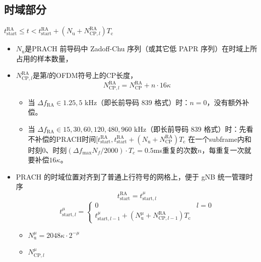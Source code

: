 \documentclass{article}
\begin{document}
\subsection{时域部分}
$t^{\text{RA}}_{\text{start}} \leq t < t^{\text{RA}}_{\text{start}} + (N_{\text{u}} + N_{\text{CP}, l}^{\text{RA}})T_\text{c}$
\begin{itemize}
\item $N_{\text{u}}$是PRACH 前导码中 Zadoff-Chu 序列（或其它低 PAPR 序列）在时域上所占用的样本数量，{\color{darkred}{具体见TS38211 Table 6.3.3.1-1 \& Table 6.3.3.1-2}}\cite{38211}\\
\item $N_{\text{CP}, l}^{\text{RA}}$是第$l$的OFDM符号上的CP长度，{\color{darkred}{具体见TS38211 Table 6.3.3.1-1 \& Table 6.3.3.1-2}}\cite{38211}\\
\[
N_{\text{CP}, l}^{\text{RA}} = N_{\text{CP}}^{\text{RA}} + n \cdot 16 \kappa
\]
	\begin{itemize}
	\item 当 $\Delta f_{\text{RA}}\in{1.25, 5}$ kHz（即长前导码 839 格式）时：$n=0$，没有额外补偿。
	\item 当 $\Delta f_{\text{RA}}\in{15,30,60,120,480,960}$ kHz（即长前导码 839 格式）时：先看不补偿的PRACH时间$[t^{\text{RA}}_{\text{start}}, t^{\text{RA}}_{\text{start}} + (N_{\text{u}} + N_{\text{CP}}^{\text{RA}})T_\text{c}$ 在一个subframe内和时刻0、时刻$(\Delta f_{\max}N_f/2000)\cdot T_c=0.5$ms重复的次数$n$，每重复一次就要补偿$16 \kappa$。
	\end{itemize}
\item PRACH 的时域位置对齐到了普通上行符号的网格上，便于 gNB 统一管理时序
\[
t^{\text{RA}}_{\text{start}} = t^{\mu}_{\text{start}, l}
\]
\[
t^{\mu}_{\text{start}, l} = 
\begin{cases}
0 & l = 0 \\
t^{\mu}_{\text{start}, l-1} + (N_{\text{u}}^\mu + N_{\text{CP}, l-1}^{\text{RA}})T_\text{c}
\end{cases}
\]
	\begin{itemize}
	\item $N_{\text{u}}^\mu = 2048\kappa \cdot 2^{-\mu}$
	\item $N_{\text{CP}, l}^\mu$
		

\end{itemize}
\end{itemize}
\end{document}
